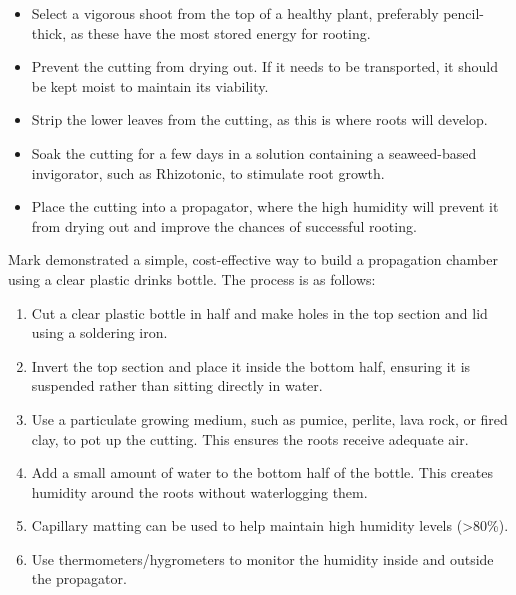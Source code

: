 \begin{itemize}
    \item Select a vigorous shoot from the top of a healthy plant, preferably pencil\--thick, as these have the most stored energy for rooting.

    \item Prevent the cutting from drying out.
    If it needs to be transported, it should be kept moist to maintain its viability.

    \item Strip the lower leaves from the cutting, as this is where roots will develop.

    \item Soak the cutting for a few days in a solution containing a seaweed\--based invigorator, such as Rhizotonic, to stimulate root growth.

    \item Place the cutting into a propagator, where the high humidity will prevent it from drying out and improve the chances of successful rooting.
\end{itemize}

\medskip

\noindent
Mark demonstrated a simple, cost\--effective way to build a propagation chamber using a clear plastic drinks bottle.
The process is as follows:

\begin{enumerate}
    \item Cut a clear plastic bottle in half and make holes in the top section and lid using a soldering iron.

    \item Invert the top section and place it inside the bottom half, ensuring it is suspended rather than sitting directly in water.

    \item Use a particulate growing medium, such as pumice, perlite, lava rock, or fired clay, to pot up the cutting.
    This ensures the roots receive adequate air.

    \item Add a small amount of water to the bottom half of the bottle.
    This creates humidity around the roots without waterlogging them.

    \item Capillary matting can be used to help maintain high humidity levels (>80\%).

    \item Use thermometers/hygrometers to monitor the humidity inside and outside the propagator.
\end{enumerate}

